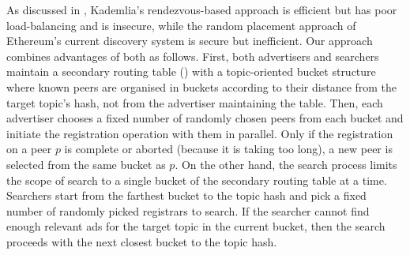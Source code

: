 
 As discussed in , Kademlia's rendezvous-based approach is efficient but has poor load-balancing and is insecure, while the random placement approach of Ethereum's current discovery system is secure but inefficient. Our approach combines advantages of both as follows. First, both advertisers and searchers maintain a secondary routing table () with a topic-oriented bucket structure where known peers are organised in buckets according to their distance from the target topic's hash, not from the advertiser maintaining the table. Then, each advertiser chooses a fixed number of randomly chosen peers from each bucket and initiate the registration operation with them in parallel. Only if the registration on a peer $p$ is complete or aborted (because it is taking too long), a new peer is selected from the same bucket as $p$. On the other hand, the search process limits the scope of search to a single bucket of the secondary routing table at a time. Searchers start from the farthest bucket to the topic hash and pick a fixed number of randomly picked registrars to search. If the searcher cannot find enough relevant ads for the target topic in the current bucket, then the search proceeds with the next closest bucket to the topic hash. 


